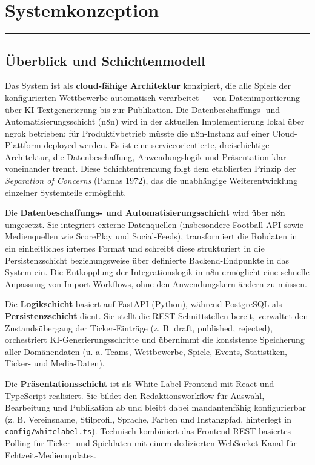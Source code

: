 \chapter{Systemkonzeption}\label{systemkonzeption}

\begin{center}\rule{0.5\linewidth}{0.5pt}\end{center}

\section{Überblick und
Schichtenmodell}\label{uxfcberblick-und-schichtenmodell}

Das System ist als \textbf{cloud-fähige Architektur} konzipiert, die
alle Spiele der konfigurierten Wettbewerbe automatisch verarbeitet ---
von Datenimportierung über KI-Textgenerierung bis zur Publikation. Die
Datenbeschaffungs- und Automatisierungsschicht (n8n) wird in der
aktuellen Implementierung lokal über ngrok betrieben; für
Produktivbetrieb müsste die n8n-Instanz auf einer Cloud-Plattform
deployed werden. Es ist eine serviceorientierte, dreischichtige Architektur,
die Datenbeschaffung, Anwendungslogik und Präsentation klar voneinander
trennt. Diese Schichtentrennung folgt dem etablierten Prinzip der
\emph{Separation of Concerns} (Parnas 1972), das die unabhängige
Weiterentwicklung einzelner Systemteile ermöglicht.

Die \textbf{Datenbeschaffungs- und Automatisierungsschicht} wird über
n8n umgesetzt. Sie integriert externe Datenquellen (insbesondere
Football-API sowie Medienquellen wie ScorePlay und Social-Feeds),
transformiert die Rohdaten in ein einheitliches internes Format und
schreibt diese strukturiert in die Persistenzschicht beziehungsweise
über definierte Backend-Endpunkte in das System ein. Die Entkopplung der
Integrationslogik in n8n ermöglicht eine schnelle Anpassung von
Import-Workflows, ohne den Anwendungskern ändern zu müssen.

Die \textbf{Logikschicht} basiert auf FastAPI (Python), während
PostgreSQL als \textbf{Persistenzschicht} dient. Sie stellt die REST-Schnittstellen bereit,
verwaltet den Zustandsübergang der Ticker-Einträge (z. B. draft,
published, rejected), orchestriert KI-Generierungsschritte und übernimmt
die konsistente Speicherung aller Domänendaten (u. a. Teams,
Wettbewerbe, Spiele, Events, Statistiken, Ticker- und Media-Daten).

Die \textbf{Präsentationsschicht} ist als White-Label-Frontend mit React
und TypeScript realisiert. Sie bildet den Redaktionsworkflow für
Auswahl, Bearbeitung und Publikation ab und bleibt dabei
mandantenfähig konfigurierbar (z. B. Vereinsname, Stilprofil, Sprache,
Farben und Instanzpfad, hinterlegt in
\texttt{config/whitelabel.ts}).
Technisch kombiniert das Frontend REST-basiertes Polling für Ticker- und
Spieldaten mit einem dedizierten WebSocket-Kanal für
Echtzeit-Medienupdates.

